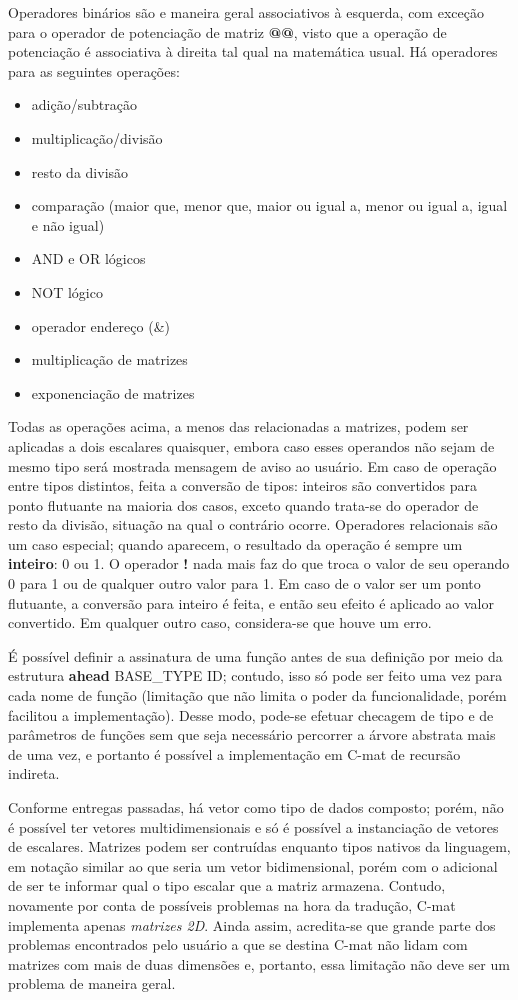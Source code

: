 \documentclass[
	article,			%
	11pt,				%
	oneside,			%
	a4paper,			%
	english,			%
	brazil,				%
	sumario=tradicional
	]{abntex2}
\renewcommand{\it}[1]{\textit{#1}}
\renewcommand{\bf}[1]{\textbf{#1}}
\begin{document}
Operadores binários são e maneira geral associativos à esquerda, com exceção para o operador de potenciação de matriz \bf{@@}, visto que a operação de potenciação é associativa à direita tal qual na matemática usual. Há operadores para as seguintes operações:
\begin{itemize}
	\item adição/subtração
	\item multiplicação/divisão
	\item resto da divisão
	\item comparação (maior que, menor que, maior ou igual a, menor ou igual a, igual e não igual)
	\item AND e OR lógicos
	\item NOT lógico
	\item operador endereço (\&)
	\item multiplicação de matrizes
	\item exponenciação de matrizes
\end{itemize}

Todas as operações acima, a menos das relacionadas a matrizes, podem ser aplicadas a dois escalares quaisquer, embora caso esses operandos não sejam de mesmo tipo será mostrada mensagem de aviso ao usuário. Em caso de operação entre tipos distintos, feita a conversão de tipos: inteiros são convertidos para ponto flutuante na maioria dos casos, exceto quando trata-se do operador de resto da divisão, situação na qual o contrário ocorre. Operadores relacionais são um caso especial; quando aparecem, o resultado da operação é sempre um \bf{inteiro}: 0 ou 1. O operador \bf{!} nada mais faz do que troca o valor de seu operando 0 para 1 ou de qualquer outro valor para 1. Em caso de o valor ser um ponto flutuante, a conversão para inteiro é feita, e então seu efeito é aplicado ao valor convertido. Em qualquer outro caso, considera-se que houve um erro.

É possível definir a assinatura de uma função antes de sua definição por meio da estrutura \bf{ahead} BASE\_TYPE ID; contudo, isso só pode ser feito uma vez para cada nome de função (limitação que não limita o poder da funcionalidade, porém facilitou a implementação). Desse modo, pode-se efetuar checagem de tipo e de parâmetros de funções sem que seja necessário percorrer a árvore abstrata mais de uma vez, e portanto é possível a implementação em C-mat de recursão indireta.

Conforme entregas passadas, há vetor como tipo de dados composto; porém, não é possível ter vetores multidimensionais e só é possível a instanciação de vetores de escalares. Matrizes podem ser contruídas
enquanto tipos nativos da linguagem, em notação similar ao que seria um vetor bidimensional, porém com o
adicional de ser te informar qual o tipo escalar que a matriz armazena. Contudo, novamente por conta de
possíveis problemas na hora da tradução, C-mat implementa apenas \it{matrizes 2D}. Ainda assim,
acredita-se que grande parte dos problemas encontrados pelo usuário a que se destina C-mat não lidam com
matrizes com mais de duas dimensões e, portanto, essa limitação não deve ser um problema de maneira
geral.
\end{document}
